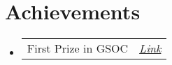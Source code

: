 \documentclass[a4paper,11pt]{article}
\makeatletter
\newcommand{\resumePOR}[3]{
\vspace{0.5mm}\item
    \begin{tabular*}{0.97\textwidth}[t]{l@{\extracolsep{\fill}}r}
        \textbf{#1}\hspace{0.3mm}#2 & \textit{\small{#3}} 
    \end{tabular*}
    \vspace{-2mm}
}
\newcommand{\resumeSubHeadingListStart}{\begin{itemize}[leftmargin=*,labelsep=1mm]}
\newcommand{\resumeSubHeadingListEnd}{\end{itemize}\vspace{2mm}}
\makeatother
\begin{document}




\section{Achievements} 
\vspace{-0.2mm}
\resumeSubHeadingListStart
  
      \resumePOR{}{First Prize in GSOC}
      {\href{https://gsocevent.com}{Link}}
      
\resumeSubHeadingListEnd
\vspace{-6mm}



    
\end{document}
